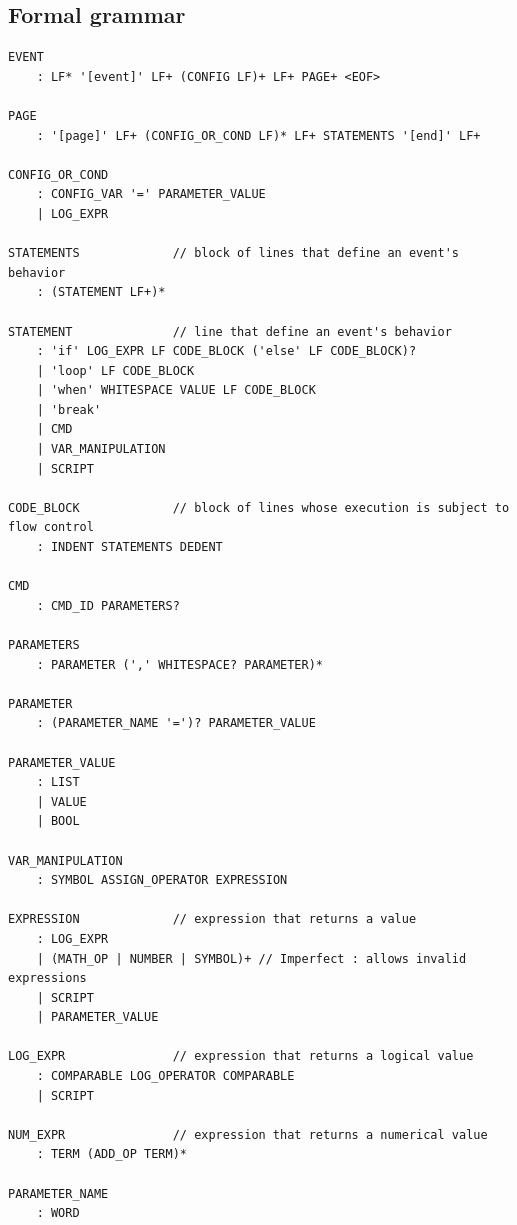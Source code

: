 \documentclass[11pt]{article}
\begin{document}
\newpage
\subsection{Formal grammar}

\begin{Verbatim}[frame=single, fontsize=\footnotesize]
EVENT
    : LF* '[event]' LF+ (CONFIG LF)+ LF+ PAGE+ <EOF>

PAGE
    : '[page]' LF+ (CONFIG_OR_COND LF)* LF+ STATEMENTS '[end]' LF+
    
CONFIG_OR_COND
    : CONFIG_VAR '=' PARAMETER_VALUE
    | LOG_EXPR
    
STATEMENTS             // block of lines that define an event's behavior
    : (STATEMENT LF+)*
    
STATEMENT              // line that define an event's behavior
    : 'if' LOG_EXPR LF CODE_BLOCK ('else' LF CODE_BLOCK)?
    | 'loop' LF CODE_BLOCK
    | 'when' WHITESPACE VALUE LF CODE_BLOCK
    | 'break'
    | CMD
    | VAR_MANIPULATION
    | SCRIPT
    
CODE_BLOCK             // block of lines whose execution is subject to flow control
    : INDENT STATEMENTS DEDENT
    
CMD
    : CMD_ID PARAMETERS?
    
PARAMETERS
    : PARAMETER (',' WHITESPACE? PARAMETER)*
    
PARAMETER
    : (PARAMETER_NAME '=')? PARAMETER_VALUE
    
PARAMETER_VALUE
    : LIST
    | VALUE
    | BOOL
    
VAR_MANIPULATION
    : SYMBOL ASSIGN_OPERATOR EXPRESSION
    
EXPRESSION             // expression that returns a value
    : LOG_EXPR
    | (MATH_OP | NUMBER | SYMBOL)+ // Imperfect : allows invalid expressions
    | SCRIPT
    | PARAMETER_VALUE
    
LOG_EXPR               // expression that returns a logical value
    : COMPARABLE LOG_OPERATOR COMPARABLE
    | SCRIPT
    
NUM_EXPR               // expression that returns a numerical value
    : TERM (ADD_OP TERM)*
    
PARAMETER_NAME
    : WORD
\end{Verbatim}
\end{document}

